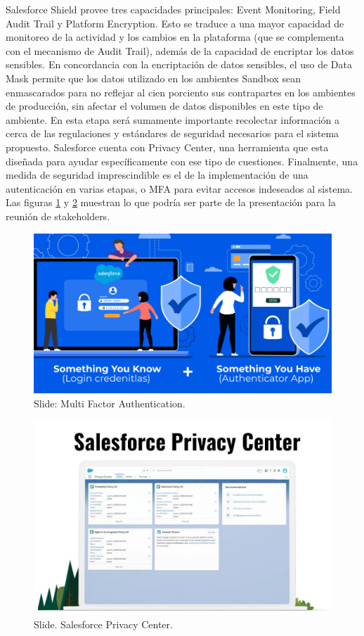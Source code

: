 \documentclass{article}
\begin{document}
Salesforce Shield provee tres capacidades principales: Event Monitoring, Field Audit Trail y Platform Encryption.
Esto se traduce a una mayor capacidad de monitoreo de la actividad y los cambios en la plataforma (que se complementa con el mecanismo de Audit Trail), además de la capacidad de encriptar los datos sensibles.
\newline \newline
En concordancia con la encriptación de datos sensibles, el uso de Data Mask permite que los datos utilizado en los ambientes Sandbox sean enmascarados para no reflejar al cien porciento sus contrapartes en los ambientes de producción, sin afectar el volumen de datos disponibles en este tipo de ambiente.
\newline \newline
En esta etapa será sumamente importante recolectar información a cerca de las regulaciones y estándares de seguridad necesarios para el sistema propuesto. Salesforce cuenta con Privacy Center, una herramienta que esta diseñada para ayudar específicamente con ese tipo de cuestiones.
\newline \newline
Finalmente, una medida de seguridad imprescindible es el de la implementación de una autenticación en varias etapas, o MFA para evitar accesos indeseados al sistema.
\newline \newline
Las figuras \ref{fig:MFA} y \ref{fig:PrivCenter} muestran lo que podría ser parte de la presentación para la reunión de stakeholders.

\begin{figure} [H]
\centering
\includegraphics[width=0.5\linewidth]{MFA.png}
\caption{\label{fig:MFA}Slide: Multi Factor Authentication.}
\end{figure}

\begin{figure} [H]
\centering
\includegraphics[width=0.5\linewidth]{Privacy Center.png}
\caption{\label{fig:PrivCenter}Slide. Salesforce Privacy Center.}
\end{figure}
\end{document}
